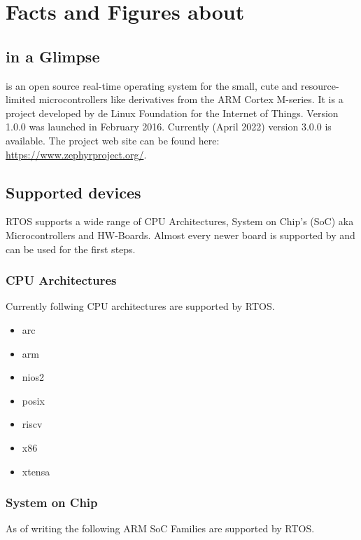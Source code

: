 \chapter{Facts and Figures about \Zephyr}

\section{\Zephyr in a Glimpse}
\Zephyr is an open source real-time operating system for the small, cute and resource-limited microcontrollers like derivatives from the ARM Cortex M-series. It is a project developed by de Linux Foundation for the Internet of Things. 
Version 1.0.0 was launched in February 2016. Currently (April 2022) version 3.0.0 is available.
The project web site can be found here: \url{https://www.zephyrproject.org/}.


\section{Supported devices}

\Zephyr RTOS supports a wide range of CPU Architectures, System on Chip's (SoC) aka Microcontrollers  and HW-Boards. Almost every newer board is supported by \Zephyr and can be used for the first steps. 

\subsection{CPU Architectures}

Currently follwing CPU architectures are supported by \Zephyr RTOS. 
\begin{multicols}{4}
\begin{itemize}
\item arc
\item arm
\item nios2
\item posix
\item riscv
\item x86
\item xtensa
\end{itemize}
\end{multicols}


\subsection{System on Chip}
As of writing the  following ARM SoC Families are supported by \Zephyr RTOS.

